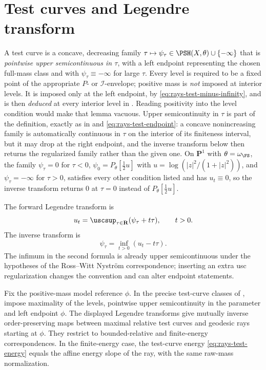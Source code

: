 \section{Test curves and Legendre transform}
\label{sec:appH-test-curves}

A test curve is a concave, decreasing family
\(\tau\mapsto\psi_\tau\in\PSH(X,\theta)\cup\{-\infty\}\) that is
\emph{pointwise upper semicontinuous in \(\tau\)}, with a left
endpoint representing the chosen full-mass class and with
\(\psi_\tau\equiv-\infty\) for large \(\tau\).  Every level is required to
be a fixed point of the appropriate \(P\)- or \(\mathcal I\)-envelope;
positive mass is \emph{not} imposed at interior levels.  It is imposed only
at the left endpoint, by \eqref{eq:rays-test-minus-infinity}, and is then
\emph{deduced} at every interior level in
.  Reading positivity into the
level condition would make that lemma vacuous.  Upper semicontinuity in
\(\tau\) is part of the definition, exactly as in
 and \eqref{eq:rays-test-endpoint}: a
concave nonincreasing family is automatically continuous in \(\tau\) on the
interior of its finiteness interval, but it may drop at the right endpoint,
and the inverse transform below then returns the regularized family rather
than the given one.  On \(\mathbf P^1\) with \(\theta=\omega_{\FS}\), the
family \(\psi_\tau=0\) for \(\tau<0\),
\(\psi_0=P_\theta[\tfrac12u]\) with \(u=\log(|z|^2/(1+|z|^2))\), and
\(\psi_\tau=-\infty\) for \(\tau>0\), satisfies every other condition
listed and has \(u_t\equiv0\), so the inverse transform returns \(0\) at
\(\tau=0\) instead of \(P_\theta[\tfrac12u]\).

The forward Legendre transform is
\[
                         u_t
       =\uscsup_{\tau\in\mathbf R}(\psi_\tau+t\tau),
                         \qquad t>0.
\]
The inverse transform is
\[
                         \psi_\tau
       =\inf_{t>0}(u_t-t\tau).
\]
The infimum in the second formula is already upper semicontinuous under
the hypotheses of the Ross--Witt Nystr\"om correspondence; inserting an
extra usc regularization changes the convention and can alter endpoint
statements.

\begin{theorem}\label{thm:appH-rwn}
Fix the positive-mass model reference \(\phi\).  In the precise test-curve
classes of , impose maximality of the levels,
pointwise upper semicontinuity in the parameter and left endpoint \(\phi\).
The displayed Legendre transforms give mutually inverse order-preserving
maps between maximal relative test curves and geodesic rays starting at
\(\phi\).  They restrict to bounded-relative and finite-energy
correspondences.  In the finite-energy case, the test-curve energy
\eqref{eq:rays-test-energy} equals the affine energy slope of the ray,
with the same raw-mass normalization.
\end{theorem}

